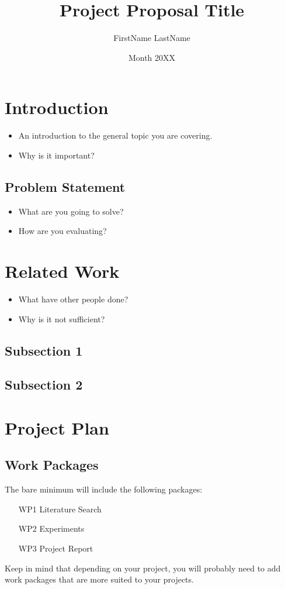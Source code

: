 \documentclass[rnd]{mas_proposal}
\title{Project Proposal Title}
\author{FirstName LastName}
\date{Month 20XX}
\begin{document}
\maketitle

\pagestyle{plain}

\section{Introduction}
\begin{itemize}
    \item An introduction to the general topic you are covering.
    \item Why is it important?
\end{itemize}

\subsection{Problem Statement}
\begin{itemize}
    \item What are you going to solve?
    \item How are you evaluating?
\end{itemize}


\section{Related Work}
\begin{itemize}
    \item What have other people done?
    \item Why is it not sufficient?
\end{itemize}

\subsection{Subsection 1}
\subsection{Subsection 2}



\section{Project Plan}

\subsection{Work Packages}
The bare minimum will include the following packages:
\begin{enumerate}
    \item[WP1] Literature Search
    \item[WP2] Experiments
    \item[WP3] Project Report
\end{enumerate}
Keep in mind that depending on your project, you will probably need to add work packages that are more suited to your projects.
\end{document}
